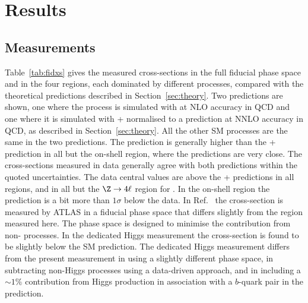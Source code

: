 \section{Results}
\label{sec:results}
\subsection{Measurements}
\label{ssec:xsecs}



Table~\ref{tab:fidxs} gives the measured cross-sections in the full
fiducial phase space
and in the four \mFourL{} regions, each dominated by different
processes, compared with the
theoretical predictions described in Section~\ref{sec:theory}. Two
predictions are shown, one where the \qqFourL{} process is simulated
with \SHERPA at NLO accuracy in  QCD and one where it is simulated with \POWHEG +
\pythia{} normalised to a prediction at NNLO accuracy in QCD, as
described in Section~\ref{sec:theory}. All the other SM processes are the same in the two
predictions.
The \SHERPA{} prediction is generally higher than the \POWHEG{} +
\pythia{} prediction in all but the on-shell  region, where the
predictions are very close.
The cross-sections measured in data generally agree with both predictions 
within the quoted uncertainties.
The data central values are above the  \POWHEG{} +
\pythia{} predictions in all regions, and
in all but the $\Z\rightarrow 4\ell$ region for \SHERPA. In the
on-shell region the \SHERPA{} prediction
is a bit more than $1\sigma$ below the data.
In Ref.~\cite{ATLAS:2020wny} the \HFourL{}  cross-section is measured
by ATLAS 
in a fiducial phase space that differs slightly from the \HFourL{} region measured here. 
The phase space is designed to minimise the contribution
from non-\HFourL{} processes.
In the dedicated Higgs measurement the cross-section is 
found to be slightly below the SM prediction. The dedicated Higgs measurement 
differs from the present measurement in using a slightly different phase space, in subtracting
non-Higgs processes using a data-driven approach, and in including a $\sim1\%$ 
contribution from  Higgs production in association with a $b$-quark pair in the prediction.

